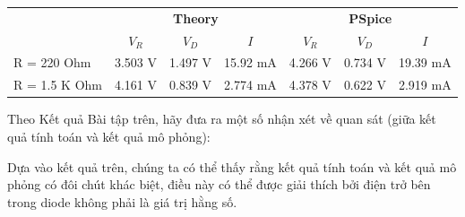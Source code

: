 \begin{table}[h]
    \centering
    \begin{tabular}{@{}lcccccc@{}}
        \toprule
        & \multicolumn{3}{c}{\textbf{Theory}} & \multicolumn{3}{c}{\textbf{PSpice}} \\
        \cmidrule(rl{0.5cm}){2-4} \cmidrule(rl{0.5cm}){5-7}
        & \textbf{$V_R$} & \textbf{$V_D$} & \textbf{$I$} & \textbf{$V_R$} & \textbf{$V_D$} & \textbf{$I$} \\
        \midrule
        R = 220 Ohm  & 3.503 V & 1.497 V & 15.92 mA & 4.266 V & 0.734 V & 19.39 mA \\ 
        R = 1.5 K Ohm & 4.161 V & 0.839 V & 2.774 mA & 4.378 V & 0.622 V & 2.919 mA \\ 
        \bottomrule
    \end{tabular}
\end{table}

Theo Kết quả Bài tập trên, hãy đưa ra một số nhận xét về quan sát (giữa kết quả tính toán và kết quả mô phỏng):

Dựa vào kết quả trên, chúng ta có thể thấy rằng kết quả tính toán và kết quả mô phỏng có đôi chút khác biệt, điều này có thể được giải thích bởi điện trở bên trong diode không phải là giá trị hằng số.